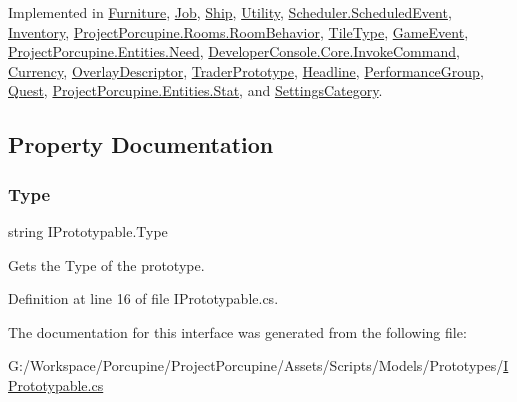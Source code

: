 Implemented in \hyperlink{class_furniture_a28d8b4c5024c93c5d4da4879ce6c2f2b}{Furniture}, \hyperlink{class_job_a4f006710b0158ef22c0b4c5b8ca63e6f}{Job}, \hyperlink{class_ship_aa81fd20c93280bc0325cf0da26f14ca5}{Ship}, \hyperlink{class_utility_a4ad3d6bda3c087221a7ec2a5a309d79e}{Utility}, \hyperlink{class_scheduler_1_1_scheduled_event_a2a4b07d98d26c870403ae7d405c0dfc9}{Scheduler.\+Scheduled\+Event}, \hyperlink{class_inventory_aac854a42e73fd7d0fa04ba3581cc339b}{Inventory}, \hyperlink{class_project_porcupine_1_1_rooms_1_1_room_behavior_a7126ff361499e55f3a2badac20549766}{Project\+Porcupine.\+Rooms.\+Room\+Behavior}, \hyperlink{class_tile_type_ae39d2b8e69a19ad1aedcd8ad9ab19727}{Tile\+Type}, \hyperlink{class_game_event_a5219d3c4766e76549b4b90926a4e5066}{Game\+Event}, \hyperlink{class_project_porcupine_1_1_entities_1_1_need_af676e3d4ffb2be13a03ebe996dbffa18}{Project\+Porcupine.\+Entities.\+Need}, \hyperlink{class_developer_console_1_1_core_1_1_invoke_command_a0d75a4414c49b069138f270a492754ee}{Developer\+Console.\+Core.\+Invoke\+Command}, \hyperlink{class_currency_a353f4810761ac68141a62c78fa248fc4}{Currency}, \hyperlink{class_overlay_descriptor_ad20c8b4b4817e2bea919a3619401ef38}{Overlay\+Descriptor}, \hyperlink{class_trader_prototype_a0b071be077414f02a1f78b3217743fe6}{Trader\+Prototype}, \hyperlink{class_headline_a528e76fd6eab76aa10ef322ffe20bd1a}{Headline}, \hyperlink{class_performance_group_a2be3d2af8490e938844a93d5ce9044bd}{Performance\+Group}, \hyperlink{class_quest_a236e119719eaaed9e39874c3d7fdac68}{Quest}, \hyperlink{class_project_porcupine_1_1_entities_1_1_stat_a420448593510dc5ef1931cc099dbf164}{Project\+Porcupine.\+Entities.\+Stat}, and \hyperlink{class_settings_category_a5c32c3b741cc15d6971866bbee00bad8}{Settings\+Category}.



\subsection{Property Documentation}
\mbox{\label{interface_i_prototypable_a89142abefe29051caf772e98e7d78e81}} 
\subsubsection{\texorpdfstring{Type}{Type}}
{\footnotesize\ttfamily string I\+Prototypable.\+Type\hspace{0.3cm}{\ttfamily [get]}}



Gets the Type of the prototype. 



Definition at line 16 of file I\+Prototypable.\+cs.



The documentation for this interface was generated from the following file\+:\begin{DoxyCompactItemize}
\item 
G\+:/\+Workspace/\+Porcupine/\+Project\+Porcupine/\+Assets/\+Scripts/\+Models/\+Prototypes/\hyperlink{_i_prototypable_8cs}{I\+Prototypable.\+cs}\end{DoxyCompactItemize}
